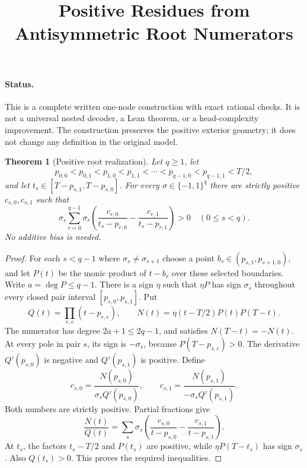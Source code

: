 \documentclass[11pt]{article}
\title{Positive Residues from Antisymmetric Root Numerators}
\author{}\date{}
\newtheorem{theorem}{Theorem}
\begin{document}
\maketitle
\paragraph{Status.}
This is a complete written one-node construction with exact rational checks.
It is not a universal nested decoder, a Lean theorem, or a head-complexity
improvement. The construction preserves the positive exterior geometry;
it does not change any definition in the original model.

\begin{theorem}[Positive root realization]
Let $q\geq1$, let
\[
 p_{0,0}<p_{0,1}<p_{1,0}<p_{1,1}<\cdots<p_{q-1,0}<p_{q-1,1}<T/2,
\]
and let $t_s\in[T-p_{s,1},T-p_{s,0}]$.
For every $\sigma\in\{-1,1\}^q$ there are strictly positive
$c_{s,0},c_{s,1}$ such that
\[
 \sigma_s\sum_{r=0}^{q-1}\sigma_r
 \left(\frac{c_{r,0}}{t_s-p_{r,0}}-
       \frac{c_{r,1}}{t_s-p_{r,1}}\right)>0
 \quad(0\leq s<q).
\]
No additive bias is needed.
\end{theorem}
\begin{proof}
For each $s<q-1$ where $\sigma_s\ne\sigma_{s+1}$ choose a point
$b_s\in(p_{s,1},p_{s+1,0})$, and let $P(t)$ be the monic product
of $t-b_s$ over these selected boundaries. Write $a=\deg P\leq q-1$.
There is a sign $\eta$ such that $\eta P$ has sign $\sigma_s$
throughout every closed pair interval $[p_{s,0},p_{s,1}]$.
Put
\[
 Q(t)=\prod_{r,e}(t-p_{r,e}),\qquad
 N(t)=\eta(t-T/2)P(t)P(T-t).
\]
The numerator has degree $2a+1\leq2q-1$, and satisfies
$N(T-t)=-N(t)$. At every pole in pair $s$, its sign is
$-\sigma_s$, because $P(T-p_{s,e})>0$.
The derivative $Q'(p_{s,0})$ is negative and $Q'(p_{s,1})$ is
positive. Define
\[
 c_{s,0}=\frac{N(p_{s,0})}{\sigma_s Q'(p_{s,0})},\qquad
 c_{s,1}=\frac{N(p_{s,1})}{-\sigma_s Q'(p_{s,1})}.
\]
Both numbers are strictly positive. Partial fractions give
\[
 \frac{N(t)}{Q(t)}=
 \sum_s\sigma_s\left(\frac{c_{s,0}}{t-p_{s,0}}
                      -\frac{c_{s,1}}{t-p_{s,1}}\right).
\]
At $t_s$, the factors $t_s-T/2$ and $P(t_s)$ are positive,
while $\eta P(T-t_s)$ has sign $\sigma_s$. Also $Q(t_s)>0$.
This proves the required inequalities.
\end{proof}
\end{document}
